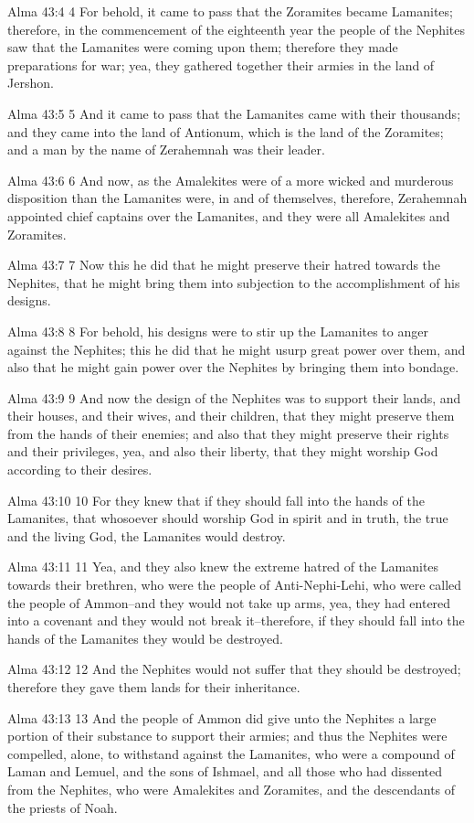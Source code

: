Alma 43:4
 4 For behold, it came to pass that the Zoramites became
Lamanites; therefore, in the commencement of the eighteenth year
the people of the Nephites saw that the Lamanites were coming
upon them; therefore they made preparations for war; yea, they
gathered together their armies in the land of Jershon.

Alma 43:5
 5 And it came to pass that the Lamanites came with their
thousands; and they came into the land of Antionum, which is the
land of the Zoramites; and a man by the name of Zerahemnah was
their leader.

Alma 43:6
 6 And now, as the Amalekites were of a more wicked and murderous
disposition than the Lamanites were, in and of themselves,
therefore, Zerahemnah appointed chief captains over the
Lamanites, and they were all Amalekites and Zoramites.

Alma 43:7
 7 Now this he did that he might preserve their hatred towards
the Nephites, that he might bring them into subjection to the
accomplishment of his designs.

Alma 43:8
 8 For behold, his designs were to stir up the Lamanites to anger
against the Nephites; this he did that he might usurp great power
over them, and also that he might gain power over the Nephites by
bringing them into bondage.

Alma 43:9
 9 And now the design of the Nephites was to support their lands,
and their houses, and their wives, and their children, that they
might preserve them from the hands of their enemies; and also
that they might preserve their rights and their privileges, yea,
and also their liberty, that they might worship God according to
their desires.

Alma 43:10
 10 For they knew that if they should fall into the hands of the
Lamanites, that whosoever should worship God in spirit and in
truth, the true and the living God, the Lamanites would destroy.

Alma 43:11
 11 Yea, and they also knew the extreme hatred of the Lamanites
towards their brethren, who were the people of Anti-Nephi-Lehi,
who were called the people of Ammon--and they would not take up
arms, yea, they had entered into a covenant and they would not
break it--therefore, if they should fall into the hands of the
Lamanites they would be destroyed.

Alma 43:12
 12 And the Nephites would not suffer that they should be
destroyed; therefore they gave them lands for their inheritance.

Alma 43:13
 13 And the people of Ammon did give unto the Nephites a large
portion of their substance to support their armies; and thus the
Nephites were compelled, alone, to withstand against the
Lamanites, who were a compound of Laman and Lemuel, and the sons
of Ishmael, and all those who had dissented from the Nephites,
who were Amalekites and Zoramites, and the descendants of the
priests of Noah.

